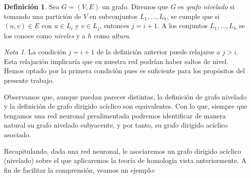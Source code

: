 \documentclass[12pt, a4paper, twoside]{book}
\numberwithin{equation}{section}
\theoremstyle{definition}
\newtheorem{defi}{Definición}[section]
\theoremstyle{remark}
\newtheorem*{remark}{Nota}
\theoremstyle{plain}
\begin{document}
	\begin{defi}
		Sea $G=(V, E)$ un grafo. Diremos que $G$ es 
		\textit{grafo nivelado} si tomando una partición de $V$ en 
		subconjuntos $L_{1},\dots,L_{h}$, se cumple que si $(u,v) \in 
		E$ con $u \in L_{i}$ y $v \in L_{j}$, entonces $j=i+1$. A los 
		conjuntos $L_{1},\dots,L_{h}$ se los conoce como 
		\textit{niveles} y a $h$ como \textit{altura}.
	\end{defi}

	\begin{remark}
		La condición $j=i+1$ de la definición anterior puede relajarse
		a $j>i$. Esta relajación implicaría que en nuestra red podrían
		haber saltos de nivel. Hemos optado por la primera condición 
		pues es suficiente para los propósitos del presente trabajo.
	\end{remark}

	Observamos que, aunque puedan parecer distintas, la definición de 
	grafo nivelado y la definición de grafo dirigido acíclico son 
	equivalentes. Con lo que, siempre que tengamos una red neuronal 
	prealimentada podremos identificar de manera natural su grafo nivelado
	subyacente, y por tanto, su grafo dirigido acíclico asociado.

	Recapitulando, dada una red neuronal, le asociaremos un grafo dirigido
	acíclico (nivelado) sobre el que aplicaremos la teoría de homología 
	vista anteriormente. A fin de facilitar la comprensión, veamos un 
	ejemplo:
\end{document}
